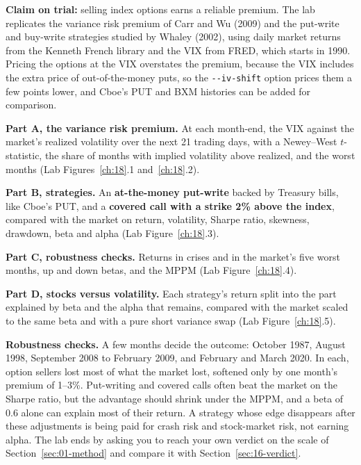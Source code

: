 \textbf{Claim on trial:} selling index options earns a reliable premium. The lab replicates the variance risk premium of Carr and Wu (2009) and the put-write and buy-write strategies studied by Whaley (2002), using daily market returns from the Kenneth French library and the VIX from FRED, which starts in 1990. Pricing the options at the VIX overstates the premium, because the VIX includes the extra price of out-of-the-money puts, so the \texttt{-{}-iv-shift} option prices them a few points lower, and Cboe's PUT and BXM histories can be added for comparison.

\textbf{Part A, the variance risk premium.} At each month-end, the VIX against the market's realized volatility over the next 21 trading days, with a Newey--West $t$-statistic, the share of months with implied volatility above realized, and the worst months (Lab Figures~\ref{ch:18}.1 and~\ref{ch:18}.2).

\textbf{Part B, strategies.} An \textbf{at-the-money put-write} backed by Treasury bills, like Cboe's PUT, and a \textbf{covered call with a strike 2\% above the index}, compared with the market on return, volatility, Sharpe ratio, skewness, drawdown, beta and alpha (Lab Figure~\ref{ch:18}.3).

\textbf{Part C, robustness checks.} Returns in crises and in the market's five worst months, up and down betas, and the MPPM (Lab Figure~\ref{ch:18}.4).

\textbf{Part D, stocks versus volatility.} Each strategy's return split into the part explained by beta and the alpha that remains, compared with the market scaled to the same beta and with a pure short variance swap (Lab Figure~\ref{ch:18}.5).

\label{sec:16-stress}
\textbf{Robustness checks.} A few months decide the outcome: October 1987, August 1998, September 2008 to February 2009, and February and March 2020. In each, option sellers lost most of what the market lost, softened only by one month's premium of 1--3\%. Put-writing and covered calls often beat the market on the Sharpe ratio, but the advantage should shrink under the MPPM, and a beta of 0.6 alone can explain most of their return. A strategy whose edge disappears after these adjustments is being paid for crash risk and stock-market risk, not earning alpha. The lab ends by asking you to reach your own verdict on the scale of Section~\ref{sec:01-method} and compare it with Section~\ref{sec:16-verdict}.


